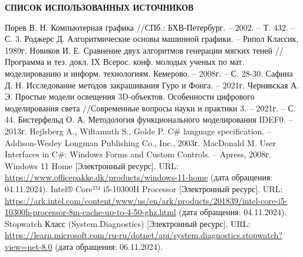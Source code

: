 \renewcommand{\bibname}{}
\begin{thebibliography}{6}
\renewcommand{\bibname}{СПИСОК ИСПОЛЬЗОВАННЫХ ИСТОЧНИКОВ}
\makeatletter
\renewcommand{\@biblabel}[1]{#1.}
\makeatother
\begin{center}
    \textbf{\bibname}
\end{center}
     Порев В. Н. Компьютерная графика //СПб.: БХВ-Петербург. – 2002. – Т. 432. – С. 3.
	Роджерс Д. Алгоритмические основы машинной графики. – Рипол Классик, 1989г.
    Новиков И. Е. Сравнение двух алгоритмов генерации мягких теней //Программа и тез. докл. IX Всерос. конф. молодых ученых по мат. моделированию и информ. технологиям. Кемерово. – 2008г. – С. 28-30.
    Сафина Д. Н. Исследование методов закрашивания Гуро и Фонга. – 2021г.
    Чернявская А. Э. Простые модели освещения 3D-объектов. Особенности цифрового моделирования света //Современные вопросы науки и практики 3. – 2021г. – С. 44.
    Бистерфельд О. А. Методология функционального моделирования IDEF0. – 2013г.
    Hejlsberg A., Wiltamuth S., Golde P. C# language specification. – Addison-Wesley Longman Publishing Co., Inc., 2003г.
    MacDonald M. User Interfaces in C#: Windows Forms and Custom Controls. – Apress, 2008г.
    Windows 11 Home [Электронный ресурс]. URL:
    \url{https://www.officepakke.dk/products/windows-11-home} (дата обращения: 04.11.2024).
    Intel® Core™ i5-10300H Processor [Электронный ресурс]. URL: \url{https://ark.intel.com/content/www/us/en/ark/products/201839/intel-core-i5-10300h-processor-8m-cache-up-to-4-50-ghz.html} (дата обращения: 04.11.2024).
    Stopwatch Класс (System.Diagnostics) [Электронный ресурс]. URL: \url{https://learn.microsoft.com/ru-ru/dotnet/api/system.diagnostics.stopwatch?view=net-8.0} (дата обращения: 06.11.2024).
\end{thebibliography}